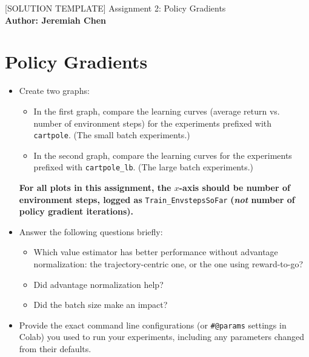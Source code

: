 \documentclass{article}
\begin{document}

\begin{centering}
    {\Large [SOLUTION TEMPLATE] Assignment 2: Policy Gradients} \\
    \vspace{.25cm}
    \textbf{Author: Jeremiah Chen} \\
\end{centering}

\setcounter{section}{3}
\section{Policy Gradients}
\begin{itemize}
\item Create two graphs:
\begin{itemize}
\item In the first graph, compare the learning curves (average return vs. number of environment steps) for the experiments prefixed with \verb|cartpole|. (The small batch experiments.)
\item In the second graph, compare the learning curves for the experiments prefixed with \verb|cartpole_lb|. (The large batch experiments.)
\end{itemize}
\textbf{For all plots in this assignment, the $x$-axis should be number of environment steps, logged as} \verb|Train_EnvstepsSoFar| \textbf{(\textit{not} number of policy gradient iterations).}
\item Answer the following questions briefly: 
\begin{itemize}
\item Which value estimator has better performance without advantage normalization: the trajectory-centric one, or the one using reward-to-go?
\item Did advantage normalization help?
\item Did the batch size make an impact?
\end{itemize}
\item Provide the exact command line configurations (or \texttt{\#@params} settings in Colab) you used to run your experiments, including any parameters changed from their defaults.
\end{itemize}
\end{document}
